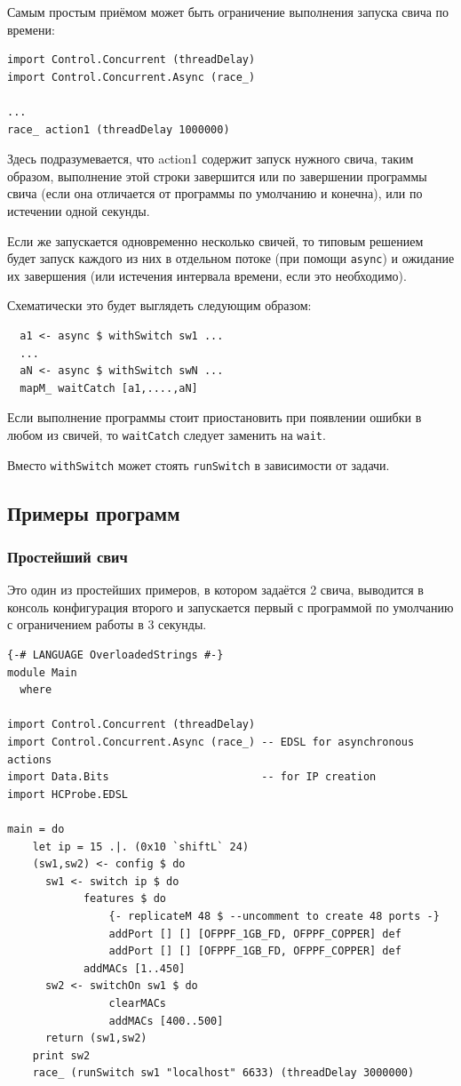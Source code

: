 \documentclass[9pt,a4paper]{article}
\begin{document}
Самым простым приёмом может быть ограничение выполнения запуска свича по времени:

\begin{lstlisting}
import Control.Concurrent (threadDelay)
import Control.Concurrent.Async (race_)

...
race_ action1 (threadDelay 1000000)
\end{lstlisting}

Здесь подразумевается, что action1 содержит запуск нужного свича, таким образом,
выполнение этой строки завершится или по завершении программы свича (если она
отличается от программы по умолчанию и конечна), или по истечении одной секунды.

Если же запускается одновременно несколько свичей, то типовым решением будет
запуск каждого из них в отдельном потоке (при помощи \lstinline!async!) и
ожидание их завершения (или истечения интервала времени, если это необходимо).

Схематически это будет выглядеть следующим образом:

\begin{lstlisting}
  a1 <- async $ withSwitch sw1 ...
  ...
  aN <- async $ withSwitch swN ...
  mapM_ waitCatch [a1,....,aN]
\end{lstlisting}

Если выполнение программы стоит приостановить при появлении ошибки в любом из
свичей, то \lstinline!waitCatch! следует заменить на \lstinline!wait!.

Вместо \lstinline!withSwitch! может стоять \lstinline!runSwitch!
в зависимости от задачи.

\subsection{Примеры программ}

\subsubsection{Простейший свич}

Это один из простейших примеров, в котором задаётся 2 свича, выводится в консоль
конфигурация второго и запускается первый с программой по умолчанию с
ограничением работы в 3 секунды.

\begin{lstlisting}
{-# LANGUAGE OverloadedStrings #-}
module Main
  where

import Control.Concurrent (threadDelay)
import Control.Concurrent.Async (race_) -- EDSL for asynchronous actions
import Data.Bits                        -- for IP creation
import HCProbe.EDSL

main = do 
    let ip = 15 .|. (0x10 `shiftL` 24)
    (sw1,sw2) <- config $ do
      sw1 <- switch ip $ do
            features $ do
                {- replicateM 48 $ --uncomment to create 48 ports -}
                addPort [] [] [OFPPF_1GB_FD, OFPPF_COPPER] def
                addPort [] [] [OFPPF_1GB_FD, OFPPF_COPPER] def
            addMACs [1..450]
      sw2 <- switchOn sw1 $ do
                clearMACs 
                addMACs [400..500]
      return (sw1,sw2)
    print sw2
    race_ (runSwitch sw1 "localhost" 6633) (threadDelay 3000000)
\end{lstlisting}
\end{document}
